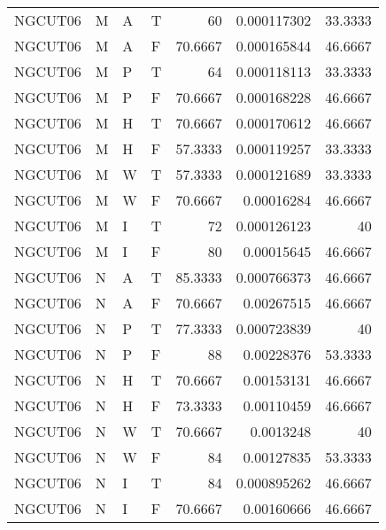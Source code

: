 \begin{tabular}{llllrrr}
    NGCUT06  & M     & A     & T          & 60         & 0.000117302 & 33.3333  \\
    NGCUT06  & M     & A     & F          & 70.6667    & 0.000165844 & 46.6667  \\
    NGCUT06  & M     & P     & T          & 64         & 0.000118113 & 33.3333  \\
    NGCUT06  & M     & P     & F          & 70.6667    & 0.000168228 & 46.6667  \\
    NGCUT06  & M     & H     & T          & 70.6667    & 0.000170612 & 46.6667  \\
    NGCUT06  & M     & H     & F          & 57.3333    & 0.000119257 & 33.3333  \\
    NGCUT06  & M     & W     & T          & 57.3333    & 0.000121689 & 33.3333  \\
    NGCUT06  & M     & W     & F          & 70.6667    & 0.00016284  & 46.6667  \\
    NGCUT06  & M     & I     & T          & 72         & 0.000126123 & 40       \\
    NGCUT06  & M     & I     & F          & 80         & 0.00015645  & 46.6667  \\
    NGCUT06  & N     & A     & T          & 85.3333    & 0.000766373 & 46.6667  \\
    NGCUT06  & N     & A     & F          & 70.6667    & 0.00267515  & 46.6667  \\
    NGCUT06  & N     & P     & T          & 77.3333    & 0.000723839 & 40       \\
    NGCUT06  & N     & P     & F          & 88         & 0.00228376  & 53.3333  \\
    NGCUT06  & N     & H     & T          & 70.6667    & 0.00153131  & 46.6667  \\
    NGCUT06  & N     & H     & F          & 73.3333    & 0.00110459  & 46.6667  \\
    NGCUT06  & N     & W     & T          & 70.6667    & 0.0013248   & 40       \\
    NGCUT06  & N     & W     & F          & 84         & 0.00127835  & 53.3333  \\
    NGCUT06  & N     & I     & T          & 84         & 0.000895262 & 46.6667  \\
    NGCUT06  & N     & I     & F          & 70.6667    & 0.00160666  & 46.6667  \\
    \hline
\end{tabular}